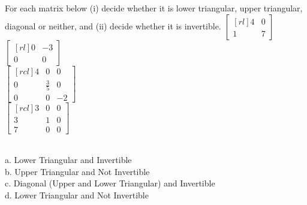 \ii  For each matrix below (i) decide whether it is lower triangular, upper triangular, diagonal or neither, and (ii) decide whether it is invertible.
\bb
\ii
$
\begin{bmatrix}[rl]
4&0\\
1&7
\end{bmatrix}$
\vspace{.1in}\\
\ii $
\begin{bmatrix}[rl]
0&-3\\
0&0
\end{bmatrix}$
\vspace{.1in}\\
\ii $
\begin{bmatrix}[rcl]
4&0&0\\
0&\frac{3}{5}&0\\
0&0&-2
\end{bmatrix}$
\vspace{.1in}\\
\ii $
\begin{bmatrix}[rcl]
3&0&0\\
3&1&0\\
7&0&0
\end{bmatrix}$
\ee
\begin{solution}\ \\
a. Lower Triangular and Invertible\\
b. Upper Triangular and Not Invertible\\
c. Diagonal (Upper and Lower Triangular) and Invertible\\
d. Lower Triangular and Not Invertible
\end{solution}

